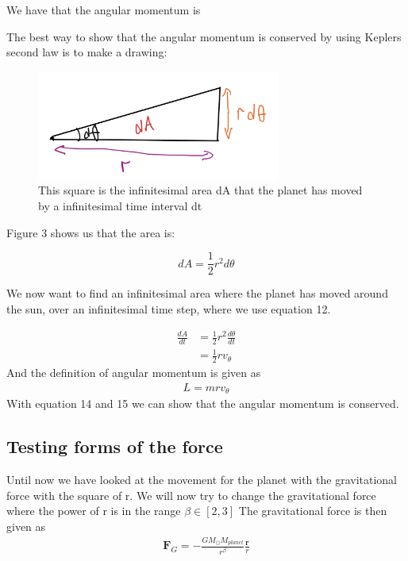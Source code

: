 \documentclass{article}
\begin{document}
We have that the angular momentum is 

The best way to show that the angular momentum is conserved by using Keplers second law is to make a drawing:

\begin{figure}[H]
	\centering
	\includegraphics[width=80mm]{sketch.jpg}
	\caption{This square is the infinitesimal area dA that the planet has moved by a infinitesimal time interval dt}
	\label{fig:1bplot}
\end{figure}


Figure 3 shows us that the area is:

\begin{equation}
    dA=\frac{1}{2}r^2d\theta
\label{eq:dA}
\end{equation}

We now want to find an infinitesimal area where the planet has moved around the sun, over an infinitesimal time step, where we use equation 12.

\begin{align}
    \frac{dA}{dt}&=\frac{1}2{r^2}\frac{d\theta}{dt}\\
    &=\frac{1}{2}rv_\theta
\end{align}
And the definition of angular momentum is given as
\begin{align}
    L=mrv_\theta
\end{align}
With equation 14 and 15 we can show that the angular momentum is conserved.
\subsection{Testing forms of the force}
Until now we have looked at the movement for the planet with the gravitational force with the square of r. We will now try to change the gravitational force where the power of r is in the range $\beta \in [2,3]$ The gravitational force is then given as
\begin{align}
    \mathbf{F}_G=-\frac{GM_{\odot}M_{planet}}{r^{\beta}}\frac{\mathbf{r}}{r}
\end{align}
\end{document}
